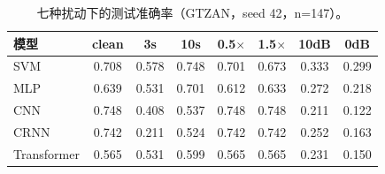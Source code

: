 \begin{table}[H]
\centering\small
\caption{七种扰动下的测试准确率（GTZAN，seed 42，n=147）。}
\label{tab:robust}
\begin{tabular}{lccccccc}
\toprule
模型 & clean & 3s & 10s & 0.5$\times$ & 1.5$\times$ & 10dB & 0dB\\
\midrule
SVM & 0.708 & 0.578 & 0.748 & 0.701 & 0.673 & 0.333 & 0.299\\
MLP & 0.639 & 0.531 & 0.701 & 0.612 & 0.633 & 0.272 & 0.218\\
CNN & 0.748 & 0.408 & 0.537 & 0.748 & 0.748 & 0.211 & 0.122\\
CRNN & 0.742 & 0.211 & 0.524 & 0.742 & 0.742 & 0.252 & 0.163\\
Transformer & 0.565 & 0.531 & 0.599 & 0.565 & 0.565 & 0.231 & 0.150\\
\bottomrule
\end{tabular}
\end{table}
